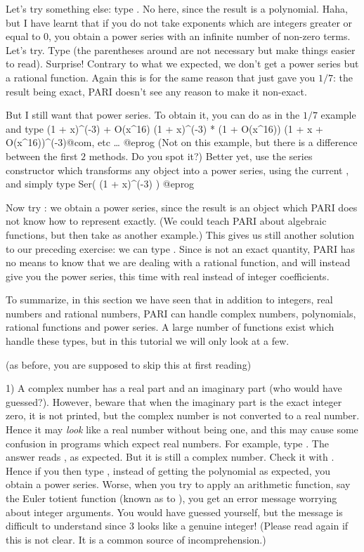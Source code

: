 Let's try something else: type . No  here, since
the result is a polynomial.  Haha, but I have learnt that if you do not take
exponents which are integers greater or equal to 0, you obtain a power series
with an infinite number of non-zero terms. Let's try.  Type
 (the parentheses around  are not necessary but
make things easier to read). Surprise! Contrary to what we expected, we don't
get a power series but a rational function. Again this is for the same reason
that  just gave you $1/7$: the result being exact, PARI doesn't see
any reason to make it non-exact.

But I still want that power series. To obtain it, you can do as in the $1/7$
example and type
\bprog
  (1 + x)^(-3) + O(x^16)
  (1 + x)^(-3) * (1 + O(x^16))
  (1 + x + O(x^16))^(-3)@com, etc \dots
@eprog\noindent
(Not on this example, but there is a difference between the first $2$
methods. Do you spot it?) Better yet, use the series constructor which
transforms any object into a power series, using the current
, and simply type
\bprog
  Ser( (1 + x)^(-3) )
@eprog

Now try : we obtain a power series, since the
result is an object which PARI does not know how to represent exactly. (We
could teach PARI about algebraic functions, but then take 
as another example.) This gives us still another solution to our preceding
exercise: we can type . Since  is not an exact
quantity, PARI has no means to know that we are dealing with a rational
function, and will instead give you the power series, this time with real
instead of integer coefficients.
\smallskip

To summarize, in this section we have seen that in addition to integers, real
numbers and rational numbers, PARI can handle complex numbers, polynomials,
rational functions and power series. A large number of functions exist which
handle these types, but in this tutorial we will only look at a few.

 (as before, you are supposed to skip this
at first reading)

1) A complex number has a real part and an imaginary part (who would have
guessed?). However, beware that when the imaginary part is the exact integer
zero, it is not printed, but the complex number is not converted to a real
number. Hence it may \emph{look} like a real number without being one, and
this may cause some confusion in programs which expect real numbers. For
example, type . The answer reads , as expected. But
it is still a complex number. Check it with . Hence if you then
type , instead of getting the polynomial  as expected, you obtain a power series. Worse, when you
try to apply an arithmetic function, say the Euler totient function (known as
 to ), you get an error message worrying about integer
arguments. You would have guessed yourself, but the message is difficult to
understand since 3 looks like a genuine integer! (Please read again if this
is not clear. It is a common source of incomprehension.)

